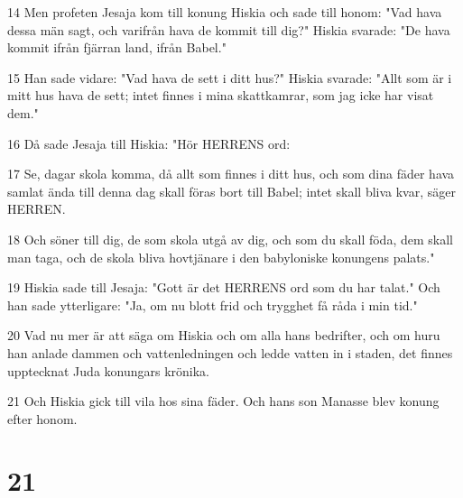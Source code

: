 \par 14 Men profeten Jesaja kom till konung Hiskia och sade till honom: "Vad hava dessa män sagt, och varifrån hava de kommit till dig?" Hiskia svarade: "De hava kommit ifrån fjärran land, ifrån Babel."
\par 15 Han sade vidare: "Vad hava de sett i ditt hus?" Hiskia svarade: "Allt som är i mitt hus hava de sett; intet finnes i mina skattkamrar, som jag icke har visat dem."
\par 16 Då sade Jesaja till Hiskia: "Hör HERRENS ord:
\par 17 Se, dagar skola komma, då allt som finnes i ditt hus, och som dina fäder hava samlat ända till denna dag skall föras bort till Babel; intet skall bliva kvar, säger HERREN.
\par 18 Och söner till dig, de som skola utgå av dig, och som du skall föda, dem skall man taga, och de skola bliva hovtjänare i den babyloniske konungens palats."
\par 19 Hiskia sade till Jesaja: "Gott är det HERRENS ord som du har talat." Och han sade ytterligare: "Ja, om nu blott frid och trygghet få råda i min tid."
\par 20 Vad nu mer är att säga om Hiskia och om alla hans bedrifter, och om huru han anlade dammen och vattenledningen och ledde vatten in i staden, det finnes upptecknat Juda konungars krönika.
\par 21 Och Hiskia gick till vila hos sina fäder. Och hans son Manasse blev konung efter honom.

\chapter{21}

